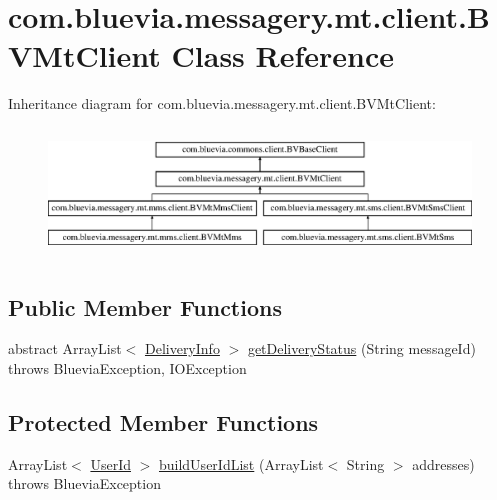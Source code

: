 \hypertarget{classcom_1_1bluevia_1_1messagery_1_1mt_1_1client_1_1BVMtClient}{
\section{com.bluevia.messagery.mt.client.BVMtClient Class Reference}
\label{classcom_1_1bluevia_1_1messagery_1_1mt_1_1client_1_1BVMtClient}
}
Inheritance diagram for com.bluevia.messagery.mt.client.BVMtClient:\begin{figure}[H]
\begin{center}
\leavevmode
\includegraphics[height=3.456790cm]{classcom_1_1bluevia_1_1messagery_1_1mt_1_1client_1_1BVMtClient}
\end{center}
\end{figure}
\subsection*{Public Member Functions}
\begin{DoxyCompactItemize}
\item 
abstract ArrayList$<$ \hyperlink{classcom_1_1bluevia_1_1messagery_1_1mt_1_1data_1_1DeliveryInfo}{DeliveryInfo} $>$ \hyperlink{classcom_1_1bluevia_1_1messagery_1_1mt_1_1client_1_1BVMtClient_a8f6f5161ebda540dd0d5e6b47951f6b5}{getDeliveryStatus} (String messageId)  throws BlueviaException, IOException
\end{DoxyCompactItemize}
\subsection*{Protected Member Functions}
\begin{DoxyCompactItemize}
\item 
ArrayList$<$ \hyperlink{classcom_1_1bluevia_1_1commons_1_1data_1_1UserId}{UserId} $>$ \hyperlink{classcom_1_1bluevia_1_1messagery_1_1mt_1_1client_1_1BVMtClient_ae3b7203ee517e87e092bd524255446c1}{buildUserIdList} (ArrayList$<$ String $>$ addresses)  throws BlueviaException
\end{DoxyCompactItemize}
